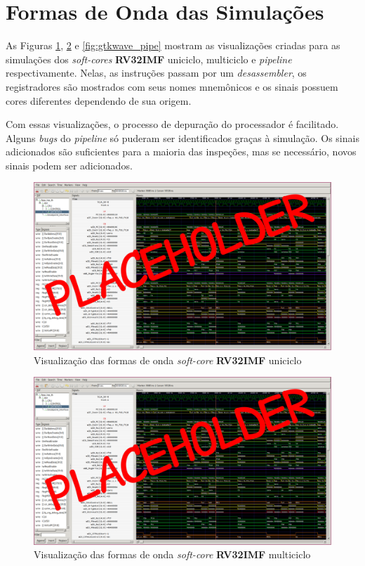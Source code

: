 \section{Formas de Onda das Simulações}
    { As Figuras \ref{fig:gtkwave_uni}, \ref{fig:gtkwave_multi} e \ref{fig:gtkwave_pipe}
        mostram as visualizações criadas para as simulações dos \textit{soft-cores}
        \textbf{RV32IMF} uniciclo, multiciclo e \textit{pipeline} respectivamente.
        Nelas, as instruções passam por um \textit{desassembler}, os registradores
        são mostrados com seus nomes mnemônicos e os sinais possuem cores diferentes
        dependendo de sua origem.
    }

    { Com essas visualizações, o processo de depuração do processador é facilitado.
        Alguns \textit{bugs} do \textit{pipeline} só puderam ser identificados graças
        à simulação. Os sinais adicionados são suficientes para a maioria das inspeções,
        mas se necessário, novos sinais podem ser adicionados.
    }

    \begin{figure}[H]
    \centering
        \includegraphics[width=0.9\linewidth]{../images/gtkwave/gtkwave_uni.png}
        \caption{Visualização das formas de onda \textit{soft-core} \textbf{RV32IMF} uniciclo}
        \label{fig:gtkwave_uni}
    \end{figure}

    \begin{figure}[H]
    \centering
        \includegraphics[width=0.9\linewidth]{../images/gtkwave/gtkwave_multi.png}
        \caption{Visualização das formas de onda \textit{soft-core} \textbf{RV32IMF} multiciclo}
        \label{fig:gtkwave_multi}
    \end{figure}

